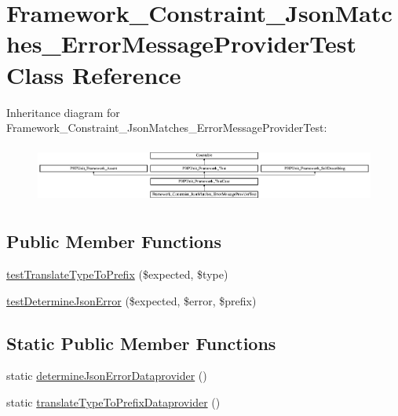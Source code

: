 \hypertarget{class_framework___constraint___json_matches___error_message_provider_test}{}\section{Framework\+\_\+\+Constraint\+\_\+\+Json\+Matches\+\_\+\+Error\+Message\+Provider\+Test Class Reference}
\label{class_framework___constraint___json_matches___error_message_provider_test}
Inheritance diagram for Framework\+\_\+\+Constraint\+\_\+\+Json\+Matches\+\_\+\+Error\+Message\+Provider\+Test\+:\begin{figure}[H]
\begin{center}
\leavevmode
\includegraphics[height=1.919452cm]{class_framework___constraint___json_matches___error_message_provider_test}
\end{center}
\end{figure}
\subsection*{Public Member Functions}
\begin{DoxyCompactItemize}
\item 
\mbox{\hyperlink{class_framework___constraint___json_matches___error_message_provider_test_a5a85516ad546db29f862ee1d07dcce98}{test\+Translate\+Type\+To\+Prefix}} (\$expected, \$type)
\item 
\mbox{\hyperlink{class_framework___constraint___json_matches___error_message_provider_test_aa8ad5d0d0d67c2e7b389ff91193d5912}{test\+Determine\+Json\+Error}} (\$expected, \$error, \$prefix)
\end{DoxyCompactItemize}
\subsection*{Static Public Member Functions}
\begin{DoxyCompactItemize}
\item 
static \mbox{\hyperlink{class_framework___constraint___json_matches___error_message_provider_test_a4f50d39d4fd9f73f61ad5bbf886baf2d}{determine\+Json\+Error\+Dataprovider}} ()
\item 
static \mbox{\hyperlink{class_framework___constraint___json_matches___error_message_provider_test_aa8899cec5a140656393375edf6cad55e}{translate\+Type\+To\+Prefix\+Dataprovider}} ()
\end{DoxyCompactItemize}
